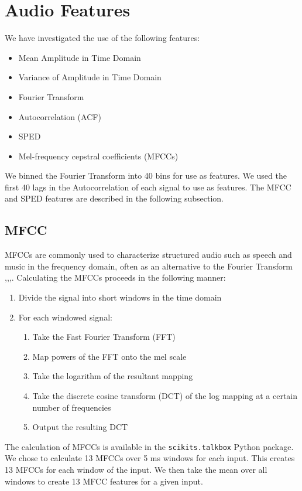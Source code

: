 \documentclass[journal]{IEEEtran}
\begin{document}
\section{Audio Features}
We have investigated the use of the following features:
\begin{itemize}
\item Mean Amplitude in Time Domain
\item Variance of Amplitude in Time Domain
\item Fourier Transform
\item Autocorrelation (ACF)
\item SPED
\item Mel-frequency cepstral coefficients (MFCCs)
\end{itemize}
We binned the Fourier Transform into 40 bins for use as features. We used the first 40 lags in the Autocorrelation of each signal to use as features. The MFCC and SPED features are described in the following subsection.

\subsection{MFCC}
MFCCs are commonly used to characterize structured audio such as speech and music in the frequency domain, often as an alternative to the Fourier Transform \cite{Chu},\cite{Chu2Env},\cite{guo2003content},\cite{aucouturier2007bag}. Calculating the MFCCs proceeds in the following manner\cite{rabiner1993fundamentals}:
\begin{enumerate}
\item Divide the signal into short windows in the time domain
\item For each windowed signal:
    \begin{enumerate}
    \item Take the Fast Fourier Transform (FFT)
    \item Map powers of the FFT onto the mel scale
    \item Take the logarithm of the resultant mapping
    \item Take the discrete cosine transform (DCT) of the log mapping at a certain number of frequencies
    \item Output the resulting DCT
    \end{enumerate}
\end{enumerate} 
The calculation of MFCCs is available in the \texttt{scikits.talkbox} Python package. We chose to calculate 13 MFCCs over 5 ms windows for each input. This creates 13 MFCCs for each window of the input. We then take the mean over all windows to create 13 MFCC features for a given input.
\end{document}

